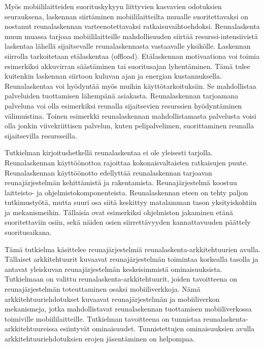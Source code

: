Myös mobiililaitteiden suorituskykyyn liittyvien kasvavien odotuksien seurauksena, laskennan siirtäminen mobiililaitteilta muualle suoritettavaksi on nostanut reunalaskennan varteenotettavaksi ratkaisuvaihtoehdoksi.
Reunalaskenta muun muassa tarjoaa mobiililaitteille mahdollisuuden siirtää resurssi-intensiivistä laskentaa lähellä sijaitsevalle reunalaskennasta vastaavalle yksikölle. Laskennan siirrolla tarkoitetaan etälaskentaa (offload).
Etälaskennan motivaationa voi toimia esimerkiksi akkuvirran säästäminen tai suoritusajan lyhentäminen. Tämä tulee kuitenkin laskennan siirtoon kuluvan ajan ja energian kustannuksella. 
Reunalaskentaa voi hyödyntää myös muihin käyttötarkoituksiin.
Se mahdollistaa palveluiden tuottamisen lähempänä asiakasta.
Reunalaskennan tarjoamana palveluna voi olla esimerkiksi reunalla sijaitsevien resurssien hyödyntäminen välimuistina.
Toinen esimerkki reunalaskennan mahdollistamasta palvelusta voisi olla jonkin viivekriittisen palvelun, kuten pelipalvelimen, suorittaminen reunalla sijaitsevilla resursseilla.



Tutkielman kirjoitushetkellä reunalaskentaa ei ole yleisesti tarjolla.
Reunalaskennan käyttöönottoa rajoittaa kokonaisvaltaisten ratkaisujen puute.
Reunalaskennan käyttöönotto edellyttää reunalaskennan tarjoavan reunajärjestelmän kehittämistä ja rakentamista.
Reunajärjestelmä koostuu laitteisto- ja ohjelmistokomponenteista.
Reunalaskennan eteen on tehty paljon tutkimustyötä, mutta suuri osa siitä keskittyy matalamman tason yksityiskohtiin ja mekanismeihin. 
Tällaisia ovat esimerkiksi ohjelmiston jakaminen etänä suoritettaviin osiin, sekä näiden osien siirrettävyyden kannattavuuden päättely suoritusaikana. 

Tämä tutkielma käsittelee reunajärjestelmiä reunalaskenta-arkkitehtuurien avulla. Tällaiset arkkitehtuurit kuvaavat reunajärjestelmän toimintaa korkealla tasolla ja antavat yleiskuvan reunajärjestelmän keskeisimmistä ominaisuuksista.
Tutkielmaan on valittu reunalaskenta-arkkitehtuurit, joiden tavoitteena on reunajärjestelmän toteuttaminen osaksi mobiiliverkkoja.
Nämä arkkitehtuuriehdotukset kuvaavat reunajärjestelmän ja mobiiliverkon mekanismeja, jotka mahdollistavat reunalaskennan tuottamisen mobiiliverkossa toimiville mobiililaitteille.
Tutkielman tavoitteena on tunnistaa reunalaskenta-arkkitehtuureissa esiintyvät ominaisuudet. Tunnistettujen ominaisuuksien avulla arkkitehtuuriehdotuksien erojen jäsentäminen on helpompaa. 

